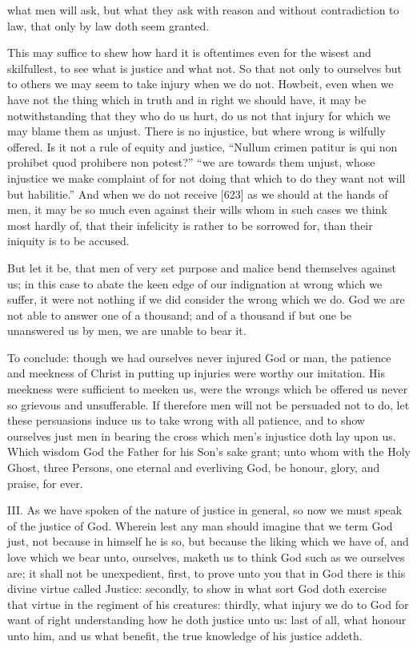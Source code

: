 what men will ask, but what they ask with reason and without contradiction to law, that only by law doth seem granted.

This may suffice to shew how hard it is oftentimes even for the wisest and skilfullest, to see what is justice and what not. So that not only to ourselves but to others we may seem to take injury when we do not. Howbeit, even when we have not the thing which in truth and in right we should have, it may be notwithstanding that they who do us hurt, do us not that injury for which we may blame them as unjust. There is no injustice, but where wrong is wilfully offered. Is it not a rule of equity and justice, “Nullum crimen patitur is qui non prohibet quod prohibere non potest?” “we are towards them unjust, whose injustice we make complaint of for not doing that which to do they want not will but habilitie.” And when we do not receive [623] as we should at the hands of men, it may be so much even against their wills whom in such cases we think most hardly of, that their infelicity is rather to be sorrowed for, than their iniquity is to be accused.

But let it be, that men of very set purpose and malice bend themselves against us; in this case to abate the keen edge of our indignation at wrong which we suffer, it were not nothing if we did consider the wrong which we do. God we are not able to answer one of a thousand; and of a thousand if but one be unanswered us by men, we are unable to bear it.

To conclude: though we had ourselves never injured God or man, the patience and meekness of Christ in putting up injuries were worthy our imitation. His meekness were sufficient to meeken us, were the wrongs which be offered us never so grievous and unsufferable. If therefore men will not be persuaded not to do, let these persuasions induce us to take wrong with all patience, and to show ourselves just men in bearing the cross which men’s injustice doth lay upon us. Which wisdom God the Father for his Son’s sake grant; unto whom with the Holy Ghost, three Persons, one eternal and everliving God, be honour, glory, and praise, for ever.

III.
As we have spoken of the nature of justice in general, so now we must speak of the justice of God. Wherein lest any man should imagine that we term God just, not because in himself he is so, but because the liking which we have of, and love which we bear unto, ourselves, maketh us to think God such as we ourselves are; it shall not be unexpedient, first, to prove unto you that in God there is this divine virtue called Justice: secondly, to show in what sort God doth exercise that virtue in the regiment of his creatures: thirdly, what injury we do to God for want of right understanding how he doth justice unto us: last of all, what honour unto him, and us what benefit, the true knowledge of his justice addeth.

